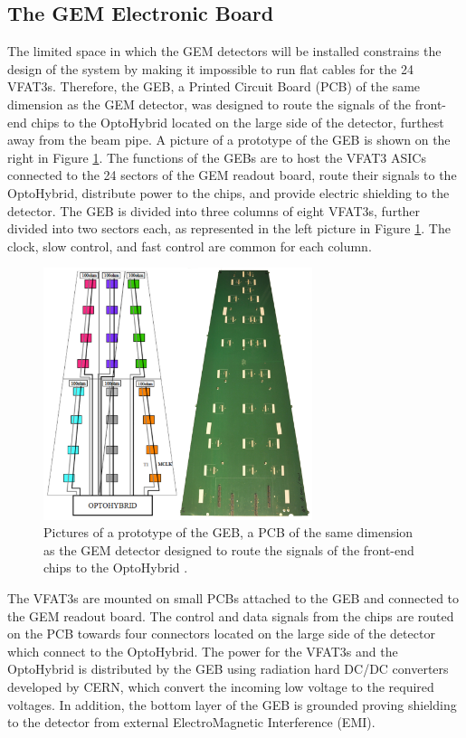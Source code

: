     \subsection{The GEM Electronic Board}

      The limited space in which the GEM detectors will be installed constrains the design of the system by making it impossible to run flat cables for the 24 VFAT3s. Therefore, the GEB, a Printed Circuit Board (PCB) of the same dimension as the GEM detector, was designed to route the signals of the front-end chips to the OptoHybrid located on the large side of the detector, furthest away from the beam pipe. A picture of a prototype of the GEB is shown on the right in Figure \ref{fig:II-2-geb}. The functions of the GEBs are to host the VFAT3 ASICs connected to the 24 sectors of the GEM readout board, route their signals to the OptoHybrid, distribute power to the chips, and provide electric shielding to the detector. The GEB is divided into three columns of eight VFAT3s, further divided into two sectors each, as represented in the left picture in Figure \ref{fig:II-2-geb}. The clock, slow control, and fast control are common for each column. \\

      \begin{figure}[b!]
        \centering
        \includegraphics[width=0.7\textwidth]{img/II-2-daq/geb.jpg}
        \caption{Pictures of a prototype of the GEB, a PCB of the same dimension as the GEM detector designed to route the signals of the front-end chips to the OptoHybrid \cite{Colaleo:2021453}.}
        \label{fig:II-2-geb}
      \end{figure}

      The VFAT3s are mounted on small PCBs attached to the GEB and connected to the GEM readout board. The control and data signals from the chips are routed on the PCB towards four connectors located on the large side of the detector which connect to the OptoHybrid. The power for the VFAT3s and the OptoHybrid is distributed by the GEB using radiation hard DC/DC converters developed by CERN, which convert the incoming low voltage to the required voltages. In addition, the bottom layer of the GEB is grounded proving shielding to the detector from external ElectroMagnetic Interference (EMI).

